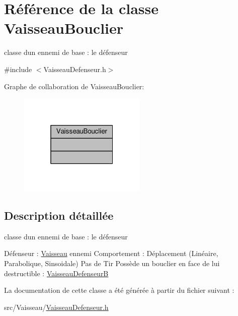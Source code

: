 \hypertarget{class_vaisseau_bouclier}{}\section{Référence de la classe Vaisseau\+Bouclier}
\label{class_vaisseau_bouclier}


classe d\textquotesingle{}un ennemi de base \+: le défenseur  




{\ttfamily \#include $<$Vaisseau\+Defenseur.\+h$>$}



Graphe de collaboration de Vaisseau\+Bouclier\+:\nopagebreak
\begin{figure}[H]
\begin{center}
\leavevmode
\includegraphics[width=172pt]{class_vaisseau_bouclier__coll__graph}
\end{center}
\end{figure}


\subsection{Description détaillée}
classe d\textquotesingle{}un ennemi de base \+: le défenseur 

Défenseur \+: \hyperlink{class_vaisseau}{Vaisseau} ennemi Comportement \+: Déplacement (Linéaire, Parabolique, Sinsoidale) Pas de Tir Possède un bouclier en face de lui destructible \+: \hyperlink{class_vaisseau_defenseur_b}{Vaisseau\+DefenseurB} 

La documentation de cette classe a été générée à partir du fichier suivant \+:\begin{DoxyCompactItemize}
\item 
src/\+Vaisseau/\hyperlink{_vaisseau_defenseur_8h}{Vaisseau\+Defenseur.\+h}\end{DoxyCompactItemize}
